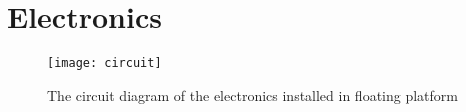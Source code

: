 \section{Electronics}
\begin{figure}[p]
   \centering
   \texttt{[image: circuit]}
   \caption{The circuit diagram of the electronics installed in floating platform}
   \label{fig:circuit}
\end{figure}
